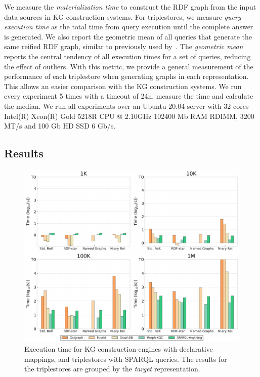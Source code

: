 We measure the \textit{materialization time} to construct the RDF graph from the input data sources in KG construction systems.
For triplestores, we measure \textit{query execution time} as the total time from query execution until the complete answer is generated. 
We also report the geometric mean of all queries that generate the same reified RDF graph, similar to previously used by~\cite{morsey2011dbpedia,schmidt2009sp}. 
The \textit{geometric mean} reports the central tendency of all execution times for a set of queries, reducing the effect of outliers. 
With this metric, we provide a general measurement of the performance of each triplestore when generating graphs in each representation. 
This allows an easier comparison with the KG construction systems. 
We run every experiment 5 times with a timeout of 24h, measure the time and calculate the median.
We run all experiments over an Ubuntu 20.04 server with
32 cores Intel(R) Xeon(R) Gold 5218R CPU @ 2.10GHz
102400 Mb RAM RDIMM, 3200 MT/s and 
100 Gb HD SSD 6 Gb/s. 




\subsection{Results}
\label{sec:chp6-1_results}


\begin{figure}[t!]
    \centering
    \includegraphics[width=\linewidth]{figures/chp6-1_results-map-queries.pdf}
    \caption{Execution time for KG construction engines with declarative mappings, and triplestores with SPARQL queries. The results for the triplestores are grouped by the \textit{target} representation.}
    \label{fig:chp6-1_map-queries}
\end{figure}




